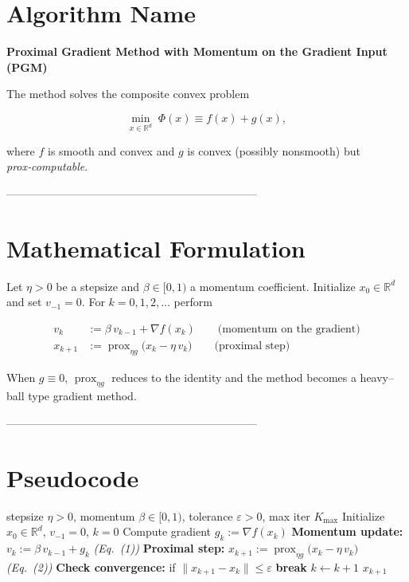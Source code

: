 \documentclass{article}
\newcommand{\prox}{\operatorname{prox}}
\newcommand{\R}{\mathbb{R}}
\begin{document}
\section*{Algorithm Name}
\textbf{Proximal Gradient Method with Momentum on the Gradient Input (PGM)}  

The method solves the composite convex problem  

\[
\min_{x\in\R^{d}}\; \Phi(x)\equiv f(x)+g(x),
\]

where $f$ is smooth and convex and $g$ is convex (possibly nonsmooth) but \emph{prox‑computable}.

--------------------------------------------------------------------

\section*{Mathematical Formulation}
Let $\eta>0$ be a stepsize and $\beta\in[0,1)$ a momentum coefficient.
Initialize $x_{0}\in\R^{d}$ and set $v_{-1}=0$.  
For $k=0,1,2,\dots$ perform  

\[
\begin{aligned}
v_{k} &:= \beta\,v_{k-1}+ \nabla f(x_{k}) \qquad\text{(momentum on the gradient)}\tag{1}\\[4pt]
x_{k+1} &:= \prox_{\eta g}\!\bigl(x_{k}-\eta\, v_{k}\bigr) \qquad\text{(proximal step)}\tag{2}
\end{aligned}
\]

When $g\equiv0$, $\prox_{\eta g}$ reduces to the identity and the method becomes a heavy–ball type gradient method.

--------------------------------------------------------------------

\section*{Pseudocode}
\begin{algorithm}[H]
\caption{Proximal Gradient with Momentum on Gradient Input (PGM)}
\begin{algorithmic}[1]
\REQUIRE stepsize $\eta>0$, momentum $\beta\in[0,1)$, tolerance $\varepsilon>0$, max iter $K_{\max}$
\STATE Initialize $x_{0}\in\R^{d}$, $v_{-1}=0$, $k=0$
\STATE Compute gradient $g_{k}:=\nabla f(x_{k})$
\STATE \textbf{Momentum update:} $v_{k}:=\beta\,v_{k-1}+g_{k}$ \hfill\textit{(Eq.~(1))}
\STATE \textbf{Proximal step:} $x_{k+1}:=\prox_{\eta g}\!\bigl(x_{k}-\eta\,v_{k}\bigr)$ \hfill\textit{(Eq.~(2))}
\STATE \textbf{Check convergence:} if $\|x_{k+1}-x_{k}\|\le\varepsilon$ \textbf{break}
\STATE $k\gets k+1$
\ENDWHILE
\RETURN $x_{k+1}$
\end{algorithmic}
\end{algorithm}
\end{document}
